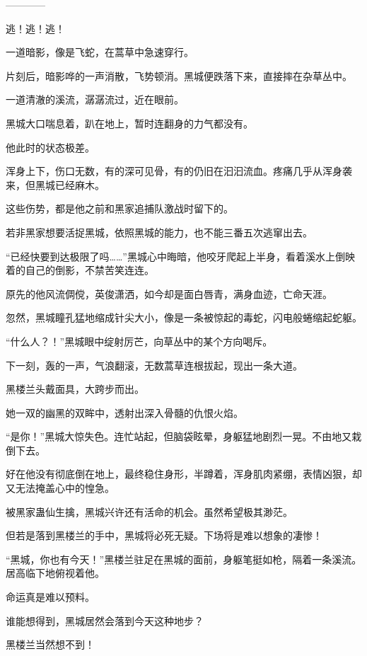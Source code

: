 
\begin{this_body}

------------

逃！逃！逃！

一道暗影，像是飞蛇，在蒿草中急速穿行。

片刻后，暗影哗的一声消散，飞势顿消。黑城便跌落下来，直接摔在杂草丛中。

一道清澈的溪流，潺潺流过，近在眼前。

黑城大口喘息着，趴在地上，暂时连翻身的力气都没有。

他此时的状态极差。

浑身上下，伤口无数，有的深可见骨，有的仍旧在汩汩流血。疼痛几乎从浑身袭来，但黑城已经麻木。

这些伤势，都是他之前和黑家追捕队激战时留下的。

若非黑家想要活捉黑城，依照黑城的能力，也不能三番五次逃窜出去。

“已经快要到达极限了吗……”黑城心中晦暗，他咬牙爬起上半身，看着溪水上倒映着的自己的倒影，不禁苦笑连连。

原先的他风流倜傥，英俊潇洒，如今却是面白唇青，满身血迹，亡命天涯。

忽然，黑城瞳孔猛地缩成针尖大小，像是一条被惊起的毒蛇，闪电般蜷缩起蛇躯。

“什么人？！”黑城眼中绽射厉芒，向草丛中的某个方向喝斥。

下一刻，轰的一声，气浪翻滚，无数蒿草连根拔起，现出一条大道。

黑楼兰头戴面具，大跨步而出。

她一双的幽黑的双眸中，透射出深入骨髓的仇恨火焰。

“是你！”黑城大惊失色。连忙站起，但脑袋眩晕，身躯猛地剧烈一晃。不由地又栽倒下去。

好在他没有彻底倒在地上，最终稳住身形，半蹲着，浑身肌肉紧绷，表情凶狠，却又无法掩盖心中的惶急。

被黑家蛊仙生擒，黑城兴许还有活命的机会。虽然希望极其渺茫。

但若是落到黑楼兰的手中，黑城将必死无疑。下场将是难以想象的凄惨！

“黑城，你也有今天！”黑楼兰驻足在黑城的面前，身躯笔挺如枪，隔着一条溪流。居高临下地俯视着他。

命运真是难以预料。

谁能想得到，黑城居然会落到今天这种地步？

黑楼兰当然想不到！


\end{this_body}
